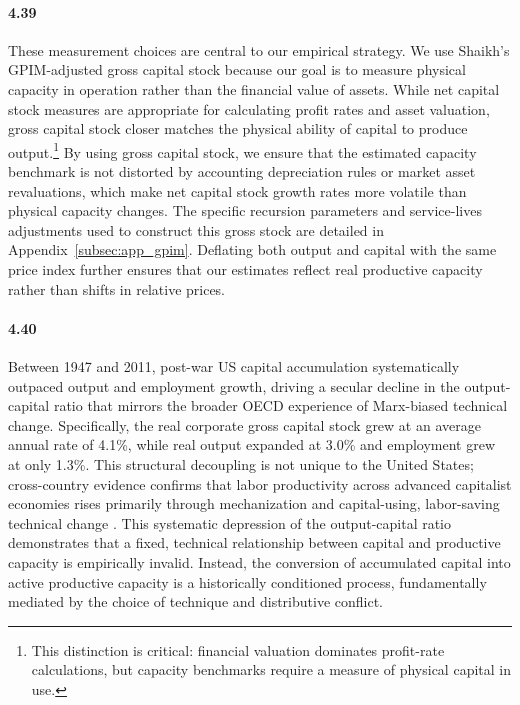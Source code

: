 \paragraph{4.39}
These measurement choices are central to our empirical strategy. We use Shaikh's GPIM-adjusted gross capital stock because our goal is to measure physical capacity in operation rather than the financial value of assets. While net capital stock measures are appropriate for calculating profit rates and asset valuation, gross capital stock closer matches the physical ability of capital to produce output.\footnote{This distinction is critical: financial valuation dominates profit-rate calculations, but capacity benchmarks require a measure of physical capital in use.} By using gross capital stock, we ensure that the estimated capacity benchmark is not distorted by accounting depreciation rules or market asset revaluations, which make net capital stock growth rates more volatile than physical capacity changes. The specific recursion parameters and service-lives adjustments used to construct this gross stock are detailed in Appendix~\ref{subsec:app_gpim}. Deflating both output and capital with the same price index further ensures that our estimates reflect real productive capacity rather than shifts in relative prices.

\paragraph{4.40}
Between 1947 and 2011, post-war US capital accumulation systematically outpaced output and employment growth, driving a secular decline in the output-capital ratio that mirrors the broader OECD experience of Marx-biased technical change. Specifically, the real corporate gross capital stock grew at an average annual rate of 4.1\%, while real output expanded at 3.0\% and employment grew at only 1.3\%. This structural decoupling is not unique to the United States; cross-country evidence confirms that labor productivity across advanced capitalist economies rises primarily through mechanization and capital-using, labor-saving technical change \citep{Marquetti2003, Basu2010}. This systematic depression of the output-capital ratio demonstrates that a fixed, technical relationship between capital and productive capacity is empirically invalid. Instead, the conversion of accumulated capital into active productive capacity is a historically conditioned process, fundamentally mediated by the choice of technique and distributive conflict.

